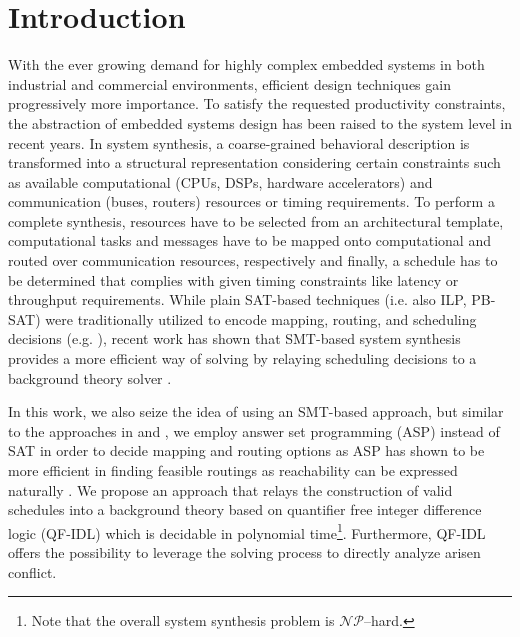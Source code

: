 \section{Introduction}
With the ever growing demand for highly complex embedded systems in both industrial and commercial environments, efficient design techniques gain progressively more importance. 
To satisfy the requested productivity constraints, the abstraction of embedded systems design has been raised to the system level in recent years. 
In system synthesis, a coarse-grained behavioral description is transformed into a structural representation considering certain constraints such as available computational (CPUs, DSPs,  hardware accelerators) and communication (buses, routers) resources or timing requirements. 
To perform a complete synthesis, resources have to be selected from an architectural template, computational tasks and messages have to be mapped onto computational and routed over communication resources, respectively and finally, a schedule has to be determined that complies with given timing constraints like latency or throughput requirements. 
While plain SAT-based techniques (i.e. also ILP, PB-SAT) were traditionally utilized to encode mapping, routing, and scheduling decisions (e.g. \cite{Lukasiewycz2012a}), recent work has shown that SMT-based system synthesis provides a more efficient way of solving by relaying scheduling decisions to a background theory solver \cite{Reimann2010}. \par 
In this work, we also seize the idea of using an SMT-based approach, but similar to the approaches in \cite{Andres2015} and \cite{Biewer2015}, we employ answer set programming (ASP) instead of SAT in order to decide mapping and routing options as ASP has shown to be more efficient in finding feasible routings as reachability can be expressed naturally \cite{Andres2013}. 
We propose an approach that relays the construction of valid schedules into a background theory based on quantifier free integer difference logic (QF-IDL) which is decidable in polynomial time\footnote{Note that the overall system synthesis problem is $\mathcal{NP}$--hard.}\cite{Sebastiani2007}. 
Furthermore, QF-IDL offers the possibility to leverage the solving process to directly analyze arisen conflict. 
